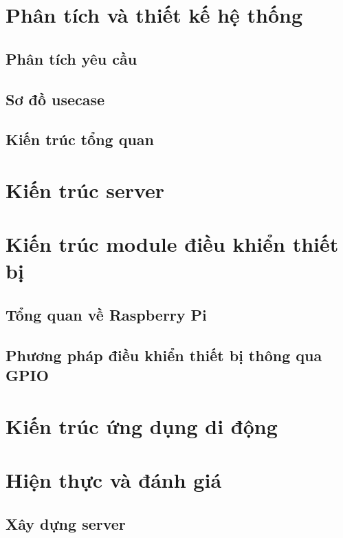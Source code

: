\documentclass[11pt,a4paper,oneside]{book}
\begin{document}
\chapter{Phân tích và thiết kế hệ thống}
\newpage
\section{Phân tích yêu cầu}
\newpage
\section{Sơ đồ usecase}
\newpage
\section{Kiến trúc tổng quan}

\chapter{Kiến trúc server}

\chapter{Kiến trúc module điều khiển thiết bị}
\newpage
\section{Tổng quan về Raspberry Pi}
\newpage
\section{Phương pháp điều khiển thiết bị thông qua GPIO}

\chapter{Kiến trúc ứng dụng di động}

\chapter{Hiện thực và đánh giá}
\newpage
\section{Xây dựng server}
\newpage
\end{document}
